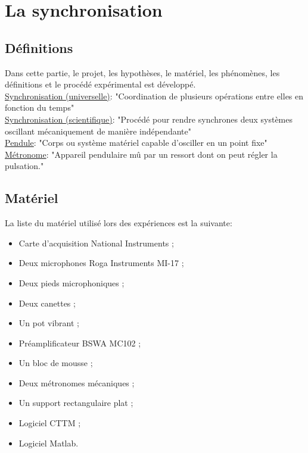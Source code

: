 \documentclass[a4paper,11pt]{report}
\begin{document}
\newpage
\null
\thispagestyle{empty}
\chapter{La synchronisation}
\section{Définitions}
Dans cette partie, le projet, les hypothèses, le matériel, les phénomènes, les définitions et le procédé expérimental est développé.\\
\underline{Synchronisation (universelle)}: "Coordination de plusieurs opérations entre elles en fonction du temps"\cite{wiki}\\
\underline{Synchronisation (scientifique)}: "Procédé pour rendre synchrones deux systèmes oscillant mécaniquement de manière indépendante"\cite{cntrl}\\
\underline{Pendule}: "Corps ou système matériel capable d'osciller en un point fixe"\cite{ikonet}\\
\underline{Métronome}: "Appareil pendulaire mû par un ressort dont on peut régler la pulsation."\cite{pend}\\

\section{Matériel}

La liste du matériel utilisé lors des expériences est la suivante:\\
\begin{itemize}[label=\textbullet, leftmargin=* ,parsep=0cm,itemsep=0cm,topsep=0cm,font=\tiny]
\item Carte d'acquisition National Instruments ;
\item Deux microphones Roga Instruments MI-17 ;
\item Deux pieds microphoniques ;
\item Deux canettes ;
\item Un pot vibrant ;
\item Préamplificateur BSWA MC102 ;
\item  Un bloc de mousse ;
\item Deux métronomes mécaniques ;
\item Un support rectangulaire plat ;
\item Logiciel CTTM ;
\item Logiciel Matlab.
\end{itemize}
\end{document}
